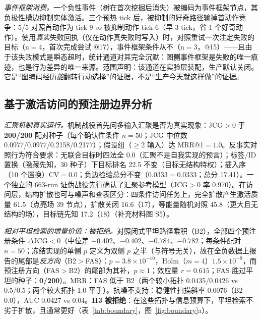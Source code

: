 \documentclass[10pt,a4paper]{ctexart}
\begin{document}
\emph{事件框架消费。}一个负性事件（树在首次挖掘后消失）被编码为事件框架节点，其负极性槽边抑制实体激活。三个预热 tick 后，被抑制的好奇路径输掉首动作竞争：5/5 对照首动作为 tick 9 \emph{vs} 被抑制动作 tick 6（早 3 tick，省 1 个好奇动作）。使用\emph{真实}失败回执（仅在动作真失败时写入）时，对照重试一次注定失败的目标（n$=$4，首次完成尝试 @17），事件框架条件从不（n$=$3，@15）——且由于该失败模式是瞬态超时，统计通道对其完全沉默：图侧事件框架是失败的唯一痕迹，也是行为差异的唯一来源。范围声明：该通道在实验层装配，生产默认关闭。它是“图编码经历\emph{能}翻转行动选择”的证据，不是“生产今天就这样做”的证据。

\subsection{基于激活访问的预注册边界分析}
\label{sec:res-boundary}

\emph{汇聚机制真实运行。}机制战役首先问多输入汇聚是否为真实现象：JCG${>}$0 于 \textbf{200/200} 配对种子（每个确认性条件 $n{=}50$；JCG 中位数 0.0977/0.0977/0.2158/0.2177）；假设组（$\ge$2 输入）达 MRR@1${=}1.0$。反事实对照行为符合要求：无联合目标时四法全 0.0（汇聚不是自我实现的预言）；标签/ID 置换（隐藏先知，30 种子）下目标排名 22.5 不变（目标无结构特权）；插入序（10 个置换）CV${=}0.0$；负边检验总分不变（0.0333${=}$0.0333；总分 17.41）。一个独立的 663-run 证伪战役先行确认了汇聚参考模型（JCG${>}0$ 率 0.970）。在访问层，结构扩散也可与噪声和查表区分：四条件访问任务上，完全扩散产生激活质量 61.5（点亮场 39 节点），扩散关闭 16.6（17），等能量随机对照 45.8（更大且无结构的场），目标链先知 17.2（18）（补充材料图 S5）。

\emph{相对平坦检索的增量价值：被拒绝。}对照闭式平坦路径乘积（B2），全部四个预注册条件 $\Delta$JCG${<}0$（中位差 ${-}0.402$、${-}0.402$、${-}0.784$、${-}0.782$；每条件配对 $n{=}50$；冻结实现的单侧 $p$ 定义为双侧 $p$ 之半（与符号无关），故在全负数据上报告的尾部是\emph{反方向}（B2${>}$FAS）：$p{=}3.8\times10^{-10}$，Holm（$m{=}4$）$1.5\times10^{-9}$，而预注册方向（FAS${>}$B2）的尾部为其补，$p{\approx}1$；效应量 $r{=}0.615$；FAS 胜过平坦的种子：\textbf{0/200}）。MRR：FAS 低于 B2（两个较小拓扑 0.0435/0.0426 vs 0.5/0.5；两个较大拓扑 1.0 平手）。抗噪不支持：稳健性扫描斜率 0.0076（B2 0.0），AUC 0.0427 vs 0.04。\textbf{H3 被拒绝}：在这些拓扑与信息预算下，平坦检索不劣于扩散，且通常更好（表~\ref{tab:boundary}，图~\ref{fig:boundary}a）。
\end{document}
